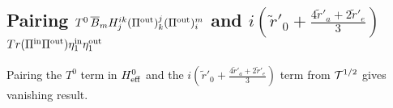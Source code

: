 \documentclass[aps,preprint,floats,epsf,epsfig,nofootinbib,letter]{revtex4}
\newcommand{\T}{{\cal T}}
\newcommand{\non}{{\nonumber}}
\begin{document}


\subsection{Pairing $T^0\, \overline B_m H^{ik}_j (\Pi^{\rm out})^j_k (\Pi^{\rm out})^m_i$ and 
$i(\tilde r'_0 +\frac{4\tilde r'_a +2\tilde r'_e}{3})$
$Tr(\Pi^{\rm in}\Pi^{\rm out})\eta_1^{\rm in}\eta_1^{\rm out}$}
Pairing the $T^0$ term in $H^0_{\rm eff}$ and the $i(\tilde r'_0 +\frac{4\tilde r'_a +2\tilde r'_e}{3})$ term from $\T^{1/2}$ gives vanishing result.
\end{document}

